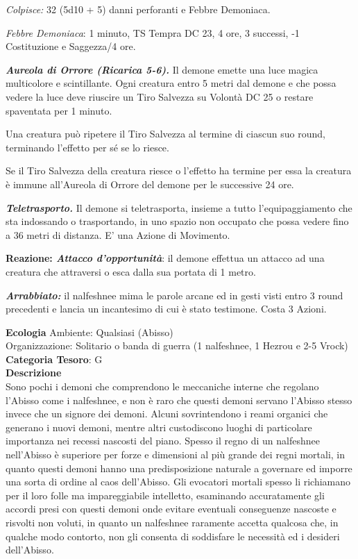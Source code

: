 \begin{multicols}{2}
{\emph{Colpisce:} 32 (5d10 + 5) danni perforanti e Febbre Demoniaca.

\emph{Febbre Demoniaca}: 1 minuto, TS Tempra DC 23, 4 ore, 3 successi, -1 Costituzione e Saggezza/4 ore.

\emph{\textbf{Aureola di Orrore (Ricarica 5-6).}} Il demone emette una luce magica multicolore e scintillante. Ogni creatura entro 5 metri dal demone e che possa vedere la luce deve riuscire un Tiro Salvezza su Volontà DC 25 o restare spaventata per 1 minuto.

Una creatura può ripetere il Tiro Salvezza al termine di ciascun suo round, terminando l'effetto per sé se lo riesce.

Se il Tiro Salvezza della creatura riesce o l'effetto ha termine per essa la creatura è immune all'Aureola di Orrore del demone per le successive 24 ore.

\emph{\textbf{Teletrasporto.}} Il demone si teletrasporta, insieme a tutto l'equipaggiamento che sta indossando o trasportando, in uno spazio non occupato che possa vedere fino a 36 metri di distanza. E' una Azione di Movimento.

\textbf{Reazione: \emph{Attacco d'opportunità}}: il demone effettua un attacco ad una creatura che attraversi o esca dalla sua portata di 1 metro.

\emph{\textbf{Arrabbiato:}} il nalfeshnee mima le parole arcane ed in gesti visti entro 3 round precedenti e lancia un incantesimo di cui è stato testimone. Costa 3 Azioni.

\textbf{Ecologia}
Ambiente: Qualsiasi (Abisso)\\
Organizzazione: Solitario o banda di guerra (1 nalfeshnee, 1 Hezrou e 2-5 Vrock)\\
\textbf{Categoria Tesoro}: G\\
\textbf{Descrizione}\\
Sono pochi i demoni che comprendono le meccaniche interne che regolano l'Abisso come i nalfeshnee, e non è raro che questi demoni servano l'Abisso stesso invece che un signore dei demoni. Alcuni sovrintendono i reami organici che generano i nuovi demoni, mentre altri custodiscono luoghi di particolare importanza nei recessi nascosti del piano. Spesso il regno di un nalfeshnee nell'Abisso è superiore per forze e dimensioni al più grande dei regni mortali, in quanto questi demoni hanno una predisposizione naturale a governare ed imporre una sorta di ordine al caos dell'Abisso. Gli evocatori mortali spesso li richiamano per il loro folle ma impareggiabile intelletto, esaminando accuratamente gli accordi presi con questi demoni onde evitare eventuali conseguenze nascoste e risvolti non voluti, in quanto un nalfeshnee raramente accetta qualcosa che, in qualche modo contorto, non gli consenta di soddisfare le necessità ed i desideri dell'Abisso.

}
\end{multicols}
